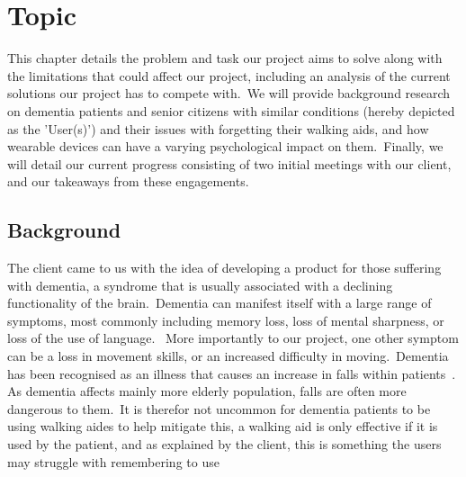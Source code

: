 \chapter{Topic} \label{ch:topic}

        This chapter details the problem and task our project aims to solve along with the limitations that could affect
        our project, including an analysis of the current solutions our project has to compete with.\ We will provide
        background research on dementia patients and senior citizens with similar conditions (hereby depicted as the
        'User(s)') and their issues with forgetting their walking aids, and how wearable devices can have a varying
        psychological impact on them.\ Finally, we will detail our current progress consisting of two initial meetings
        with our client, and our takeaways from these engagements.

    \section{Background}

        The client came to us with the idea of developing a product for those suffering with dementia, a syndrome that
        is usually associated with a declining functionality of the brain.\ Dementia can manifest itself with a large
        range of symptoms, most commonly including memory loss, loss of mental sharpness, or loss of the use of
        language.~\cite{nhs_choices} More importantly to our project, one other symptom can be a loss in movement
        skills, or an increased difficulty in moving.\ Dementia has been recognised as an illness that causes an
        increase in falls within
        patients~\cite{doorn_gruber-baldini_zimmerman_hebel_port_baumgarten_quinn_taler_may_magaziner_et_al._2003}. As
        dementia affects mainly more elderly population, falls are often more dangerous to them.\ It is therefor not
        uncommon for dementia patients to be using walking aides to help mitigate this, a walking aid is only effective
        if it is used by the patient, and as explained by the client, this is something the users may struggle with
        remembering to use

